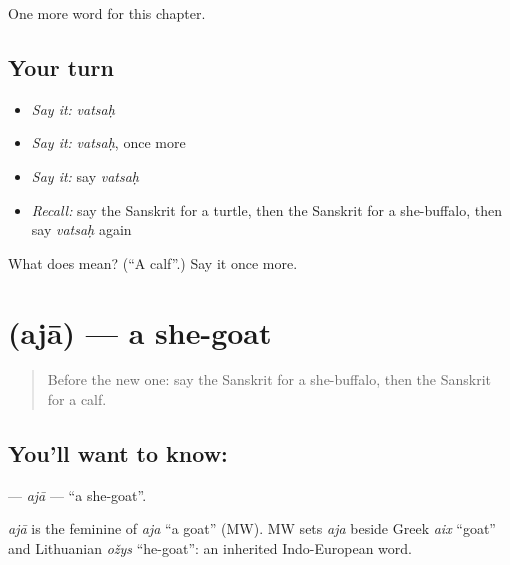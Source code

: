 \begin{grammarlens}[title={What you've built}]
One more word for this chapter.
\end{grammarlens}

\subsection*{Your turn}
\begin{itemize}
\raggedright
  \item \emph{Say it:} \emph{vatsaḥ}
  \item \emph{Say it:} \emph{vatsaḥ}, once more
  \item \emph{Say it:} say \emph{vatsaḥ}
  \item \emph{Recall:} say the Sanskrit for a turtle, then the Sanskrit for a she-buffalo, then say \emph{vatsaḥ} again
\end{itemize}

\begin{tcolorbox}[breakable,colback=teal!4,colframe=teal!35!black,title={Before you move on}]
What does  mean? (\textquotedblleft{}A calf\textquotedblright{}.) Say it once more.
\end{tcolorbox}
\section[\texorpdfstring{\sk{अजा} (ajā)}{अजा (ajā)}]{ (ajā) — a she-goat}

\label{lesson:SA-C167-aja}



\begin{quote}
Before the new one: say the Sanskrit for a she-buffalo, then the Sanskrit for a calf.
\end{quote}

\subsection*{You'll want to know: }
\textbf{} — \emph{ajā} — \textquotedblleft{}a she-goat\textquotedblright{}.

\begin{cousinweb}
\emph{ajā} is the feminine of \emph{aja} \textquotedblleft{}a goat\textquotedblright{} (MW). MW sets \emph{aja} beside Greek \emph{aix} \textquotedblleft{}goat\textquotedblright{} and Lithuanian \emph{ožys} \textquotedblleft{}he-goat\textquotedblright{}: an inherited Indo-European word.
\end{cousinweb}

